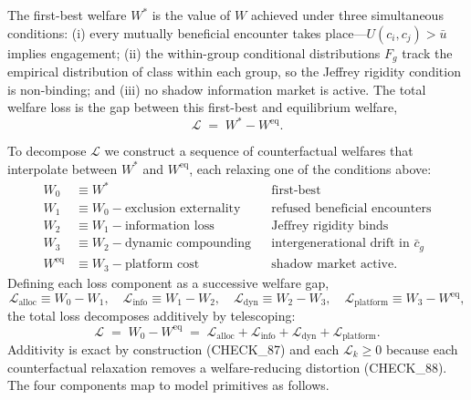 \documentclass[12pt,a4paper]{article}
\theoremstyle{definition}
\numberwithin{proposition}{section}
\begin{document}
The first-best welfare $W^*$ is the value of $W$ achieved under three
simultaneous conditions: (i) every mutually beneficial encounter
takes place---$U(c_i, c_j) > \bar{u}$ implies engagement; (ii) the
within-group conditional distributions $F_g$ track the empirical
distribution of class within each group, so the Jeffrey rigidity
condition is non-binding; and (iii) no shadow information market is
active. The total welfare loss is the gap between this first-best and
equilibrium welfare,
\begin{equation}
  \mathcal{L} \;=\; W^* - W^{\mathrm{eq}}.
\end{equation}

To decompose $\mathcal{L}$ we construct a sequence of counterfactual
welfares that interpolate between $W^*$ and $W^{\mathrm{eq}}$, each
relaxing one of the conditions above:
\begin{align*}
  W_0 &\equiv W^* && \text{first-best} \\
  W_1 &\equiv W_0 - \text{exclusion externality}
       && \text{refused beneficial encounters} \\
  W_2 &\equiv W_1 - \text{information loss}
       && \text{Jeffrey rigidity binds} \\
  W_3 &\equiv W_2 - \text{dynamic compounding}
       && \text{intergenerational drift in } \bar{c}_g \\
  W^{\mathrm{eq}} &\equiv W_3 - \text{platform cost}
       && \text{shadow market active.}
\end{align*}
Defining each loss component as a successive welfare gap,
\begin{equation}
  \mathcal{L}_{\text{alloc}} \equiv W_0 - W_1, \quad
  \mathcal{L}_{\text{info}} \equiv W_1 - W_2, \quad
  \mathcal{L}_{\text{dyn}} \equiv W_2 - W_3, \quad
  \mathcal{L}_{\text{platform}} \equiv W_3 - W^{\mathrm{eq}},
  \label{eq:welfare-defs}
\end{equation}
the total loss decomposes additively by telescoping:
\begin{equation}
  \mathcal{L} \;=\; W_0 - W^{\mathrm{eq}}
        \;=\; \mathcal{L}_{\text{alloc}} + \mathcal{L}_{\text{info}}
        + \mathcal{L}_{\text{dyn}} + \mathcal{L}_{\text{platform}}.
  \label{eq:welfare}
\end{equation}
Additivity is exact by construction (CHECK\_87) and each
$\mathcal{L}_k \geq 0$ because each counterfactual relaxation
removes a welfare-reducing distortion (CHECK\_88). The four
components map to model primitives as follows.
\end{document}
